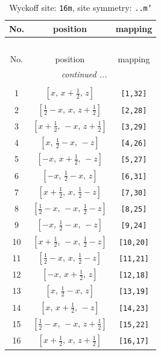 \documentclass[fleqn,8pt]{jsarticle}
\begin{document}
\renewcommand{\arraystretch}{1.2}
\begin{longtable}{ccc}
\caption{Wyckoff site: {\tt 16m}, site symmetry: {\tt ..m'}}
 \\
 \hline \hline
No. & position & mapping \\ \hline \endfirsthead

\multicolumn{2}{l}{\tablename\ \thetable{}} \\
 \hline \hline
No. & position & mapping \\ \hline \endhead

 \hline \hline
\multicolumn{2}{r}{\footnotesize\it continued ...} \\ \endfoot

 \hline \hline
\multicolumn{2}{r}{} \\ \endlastfoot

1 & $\left[ x,\, x + \frac{1}{2},\, z \right]$ & {\tt [1,32]} \\ \hline
2 & $\left[ \frac{1}{2} - x,\, x,\, z + \frac{1}{2} \right]$ & {\tt [2,28]} \\ \hline
3 & $\left[ x + \frac{1}{2},\, - x,\, z + \frac{1}{2} \right]$ & {\tt [3,29]} \\ \hline
4 & $\left[ x,\, \frac{1}{2} - x,\, - z \right]$ & {\tt [4,26]} \\ \hline
5 & $\left[ - x,\, x + \frac{1}{2},\, - z \right]$ & {\tt [5,27]} \\ \hline
6 & $\left[ - x,\, \frac{1}{2} - x,\, z \right]$ & {\tt [6,31]} \\ \hline
7 & $\left[ x + \frac{1}{2},\, x,\, \frac{1}{2} - z \right]$ & {\tt [7,30]} \\ \hline
8 & $\left[ \frac{1}{2} - x,\, - x,\, \frac{1}{2} - z \right]$ & {\tt [8,25]} \\ \hline
9 & $\left[ - x,\, \frac{1}{2} - x,\, - z \right]$ & {\tt [9,24]} \\ \hline
10 & $\left[ x + \frac{1}{2},\, - x,\, \frac{1}{2} - z \right]$ & {\tt [10,20]} \\ \hline
11 & $\left[ \frac{1}{2} - x,\, x,\, \frac{1}{2} - z \right]$ & {\tt [11,21]} \\ \hline
12 & $\left[ - x,\, x + \frac{1}{2},\, z \right]$ & {\tt [12,18]} \\ \hline
13 & $\left[ x,\, \frac{1}{2} - x,\, z \right]$ & {\tt [13,19]} \\ \hline
14 & $\left[ x,\, x + \frac{1}{2},\, - z \right]$ & {\tt [14,23]} \\ \hline
15 & $\left[ \frac{1}{2} - x,\, - x,\, z + \frac{1}{2} \right]$ & {\tt [15,22]} \\ \hline
16 & $\left[ x + \frac{1}{2},\, x,\, z + \frac{1}{2} \right]$ & {\tt [16,17]} \\
\end{longtable}
\end{document}
